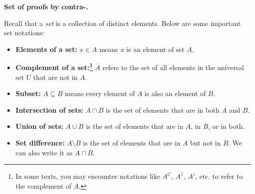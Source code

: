 \documentclass[11pt,addpoints,answers]{exam}
\begin{document}
\begin{questions}

    \question \textbf{Set of proofs by contra-.}
    
    Recall that a \emph{set} is a collection of distinct elements. Below are some important set notations:
    \begin{itemize}
        \item \textbf{Elements of a set:} $x \in A$ means $x$ is an element of set $A$. 
        \item \textbf{Complement of a set:\footnote{In some texts, you may encounter notations like $A^C$, $A^\complement$, $A'$, etc. to refer to the complement of $A$.}} $\overline{A}$ refers to the set of all elements in the universal set $U$ that are not in $A$.
        \item \textbf{Subset:} $A \subseteq B$ means every element of $A$ is also an element of $B$. 
        \item \textbf{Intersection of sets:} $A \cap B$ is the set of elements that are in both $A$ and $B$. 
        \item \textbf{Union of sets:} $A \cup B$ is the set of elements that are in $A$, in $B$, or in both.
        \item \textbf{Set difference:} $A \setminus B$ is the set of elements that are in $A$ but not in $B$. We can also write it as $A \cap \overline{B}$.
    \end{itemize}

\end{questions}
\end{document}
